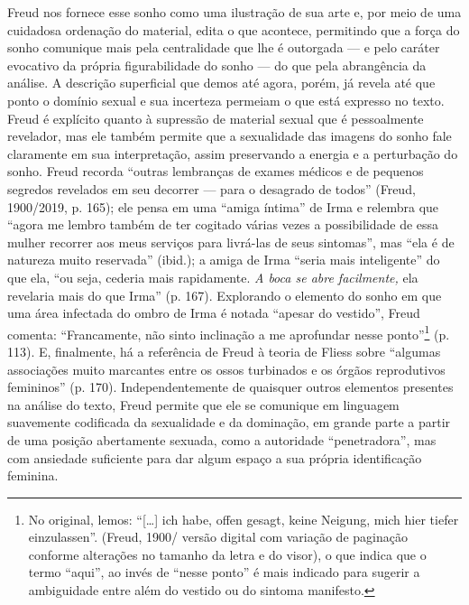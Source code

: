 Freud nos fornece esse sonho como uma ilustração de sua arte e, por meio
de uma cuidadosa ordenação do material, edita o que acontece, permitindo
que a força do sonho comunique mais pela centralidade que lhe é
outorgada --- e pelo caráter evocativo da própria figurabilidade do sonho
--- do que pela abrangência da análise. A descrição superficial que demos
até agora, porém, já revela até que ponto o domínio sexual e sua
incerteza permeiam o que está expresso no texto. Freud é explícito
quanto à supressão de material sexual que é pessoalmente revelador, mas
ele também permite que a sexualidade das imagens do sonho fale
claramente em sua interpretação, assim preservando a energia e a
perturbação do sonho. Freud recorda ``outras lembranças de exames
médicos e de pequenos segredos revelados em seu decorrer --- para o
desagrado de todos'' (Freud, 1900/2019, p. 165); ele pensa em uma
``amiga íntima'' de Irma e relembra que ``agora me lembro também de ter
cogitado várias vezes a possibilidade de essa mulher recorrer aos meus
serviços para livrá-las de seus sintomas'', mas ``ela é de natureza
muito reservada'' (ibid.); a amiga de Irma ``seria mais inteligente'' do
que ela, ``ou seja, cederia mais rapidamente. \emph{A boca se abre
facilmente,} ela revelaria mais do que Irma'' (p. 167). Explorando o
elemento do sonho em que uma área infectada do ombro de Irma é notada
``apesar do vestido'', Freud comenta: ``Francamente, não sinto
inclinação a me aprofundar nesse ponto''\footnote{No original, lemos:
  ``{[}\ldots{}{]} ich habe, offen gesagt, keine Neigung, mich hier
  tiefer einzulassen''. (Freud, 1900/ versão digital com variação de
  paginação conforme alterações no tamanho da letra e do visor), o que
  indica que o termo ``aqui'', ao invés de ``nesse ponto'' é mais
  indicado para sugerir a ambiguidade entre além do vestido ou do
  sintoma manifesto.} (p. 113). E, finalmente, há a referência de Freud
à teoria de Fliess sobre ``algumas associações muito marcantes entre os
ossos turbinados e os órgãos reprodutivos femininos'' (p. 170).
Independentemente de quaisquer outros elementos presentes na análise do
texto, Freud permite que ele se comunique em linguagem suavemente
codificada da sexualidade e da dominação, em grande parte a partir de
uma posição abertamente sexuada, como a autoridade ``penetradora'', mas
com ansiedade suficiente para dar algum espaço a sua própria
identificação feminina.

